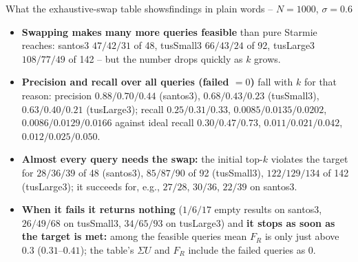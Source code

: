 \documentclass[aspectratio=169,10pt]{beamer}
\newcommand{\highlight}[1]{{\color{Cat1}\bfseries #1}}
\begin{document}
\begin{frame}{What the exhaustive-swap table shows}{findings in plain words -- $N{=}1000$, $\sigma{=}0.6$}
\small
\begin{itemize}\setlength\itemsep{4pt}
\item \highlight{Swapping makes many more queries feasible} than pure Starmie reaches: santos3 $47/42/31$ of 48, tusSmall3 $66/43/24$ of 92, tusLarge3 $108/77/49$ of 142 -- but the number drops quickly as $k$ grows.
\item \highlight{Precision and recall over all queries (failed $=0$)} fall with $k$ for that reason: precision $0.88/0.70/0.44$ (santos3), $0.68/0.43/0.23$ (tusSmall3), $0.63/0.40/0.21$ (tusLarge3); recall $0.25/0.31/0.33$, $0.0085/0.0135/0.0202$, $0.0086/0.0129/0.0166$ against ideal recall $0.30/0.47/0.73$, $0.011/0.021/0.042$, $0.012/0.025/0.050$.
\item \highlight{Almost every query needs the swap:} the initial top-$k$ violates the target for $28/36/39$ of 48 (santos3), $85/87/90$ of 92 (tusSmall3), $122/129/134$ of 142 (tusLarge3); it succeeds for, e.g., $27/28$, $30/36$, $22/39$ on santos3.
\item \highlight{When it fails it returns nothing} ($1/6/17$ empty results on santos3, $26/49/68$ on tusSmall3, $34/65/93$ on tusLarge3) and \highlight{it stops as soon as the target is met:} among the feasible queries mean $F_R$ is only just above $0.3$ ($0.31$--$0.41$); the table's $\Sigma U$ and $F_R$ include the failed queries as 0.
\end{itemize}
\end{frame}
\end{document}
